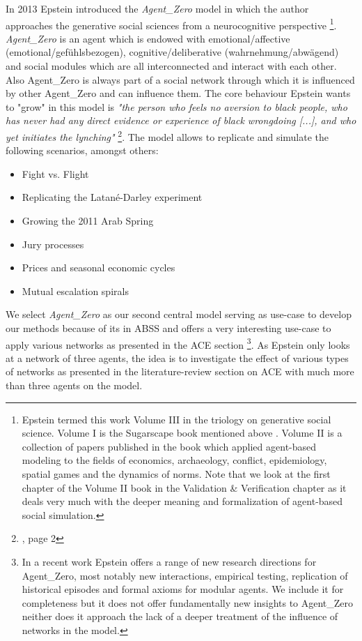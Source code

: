 In 2013 Epstein introduced the \textit{Agent\_Zero} model \cite{epstein_agent_zero:_2014} in which the author approaches the generative social sciences from a neurocognitive perspective \footnote{Epstein termed this work Volume III in the triology on generative social science. Volume I is the Sugarscape book mentioned above \cite{epstein_growing_1996}. Volume II is a collection of papers published in the book \cite{epstein_generative_2012} which applied agent-based modeling to the fields of economics, archaeology, conflict, epidemiology, spatial games and the dynamics of norms. Note that we look at the first chapter of the Volume II book in the Validation \& Verification chapter as it deals very much with the deeper meaning and formalization of agent-based social simulation.}.
\textit{Agent\_Zero} is an agent which is endowed with emotional/affective (emotional/gefühlsbezogen), cognitive/deliberative (wahrnehmung/abwägend) and social modules which are all interconnected and interact with each other. Also Agent\_Zero is always part of a social network through which it is influenced by other Agent\_Zero and can influence them. The core behaviour Epstein wants to "grow" in this model is \textit{"the person who feels no aversion to black people, who has never had any direct evidence or experience of black wrongdoing [...], and who yet initiates the lynching"} \footnote{\cite{epstein_agent_zero:_2014}, page 2}. The model allows to replicate and simulate the following scenarios, amongst others:

\begin{itemize}
	\item Fight vs. Flight
	\item Replicating the Latané-Darley experiment
	\item Growing the 2011 Arab Spring
	\item Jury processes
	\item Prices and seasonal economic cycles
	\item Mutual escalation spirals
\end{itemize}

We select \textit{Agent\_Zero} as our second central model serving as use-case to develop our methods because of its in ABSS and offers a very interesting use-case to apply various networks as presented in the ACE section \footnote{In a recent work \cite{epstein_advancing_2016} Epstein offers a range of new research directions for Agent\_Zero, most notably new interactions, empirical testing, replication of historical episodes and formal axioms for modular agents. We include it for completeness but it does not offer fundamentally new insights to Agent\_Zero neither does it approach the lack of a deeper treatment of the influence of networks in the model.}. As Epstein only looks at a network of three agents, the idea is to investigate the effect of various types of networks as presented in the literature-review section on ACE with much more than three agents on the model.